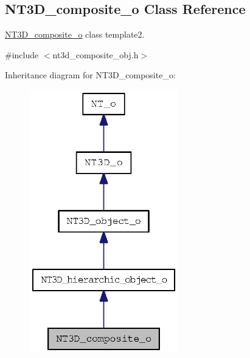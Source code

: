 \subsection{NT3D\_\-composite\_\-o Class Reference}
\label{class_n_t3_d__composite__o}


\hyperlink{class_n_t3_d__composite__o}{NT3D\_\-composite\_\-o} class template2.  




{\ttfamily \#include $<$nt3d\_\-composite\_\-obj.h$>$}



Inheritance diagram for NT3D\_\-composite\_\-o:
\nopagebreak
\begin{figure}[H]
\begin{center}
\leavevmode
\includegraphics[width=184pt]{class_n_t3_d__composite__o__inherit__graph}
\end{center}
\end{figure}


